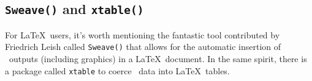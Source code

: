 \documentclass{article}
\begin{document}
\subsection{\texttt{Sweave()} and \texttt{xtable()}}

For \LaTeX~users, it's
worth mentioning the fantastic tool contributed by Friedrich Leish \cite{Sweave}
called \texttt{Sweave()} that allows for the automatic insertion
of \Rlogo{}~outputs (including graphics) in a \LaTeX~document. In the same spirit, there
is a package called \texttt{xtable} to coerce \Rlogo{}~data into \LaTeX~tables.


\clearpage
{}


\end{document}
